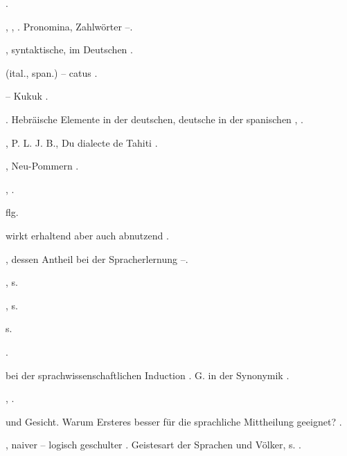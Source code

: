 \begin{register}
 \pageref{sp.248}.

 \pageref{sp.142}, \pageref{sp.282}, \pageref{sp.307}. Pronomina, Zahlwörter \pageref{sp.160}–\pageref{sp.161}.

, syntaktische, im Deutschen \sed{\pageref{sp.243},} \pageref{sp.272}.

 (ital., span.) – catus \pageref{sp.190}.


 – Kukuk \pageref{sp.208}.

 \pageref{sp.45}. Hebräische Elemente in der deutschen, deutsche in der spanischen \pageref{sp.288}, \pageref{sp.289}.

, P. L. J. B., Du dialecte de Tahiti \pageref{sp.463}.

, Neu-Pommern \pageref{sp.165}.

 \pageref{sp.2}, \pageref{sp.311}.


 \pageref{sp.319} flg.

 wirkt erhaltend aber auch abnutzend \pageref{sp.182}.

, dessen Antheil bei der Spracherlernung \pageref{sp.63}–\pageref{sp.64}.

, s. 


, s. 

 \sed{\pageref{sp.282},} s. 

 \pageref{sp.45}.

 bei der sprachwissenschaftlichen Induction \pageref{sp.48}. G. in der Synonymik \pageref{sp.100}.

 \pageref{sp.244}, \pageref{sp.381}.

 und Gesicht. Warum Ersteres besser für die sprachliche Mittheilung geeignet? \pageref{sp.312}.


, naiver – logisch geschulter \pageref{sp.39}. Geistesart der Sprachen und Völker, s. .


\end{register}
